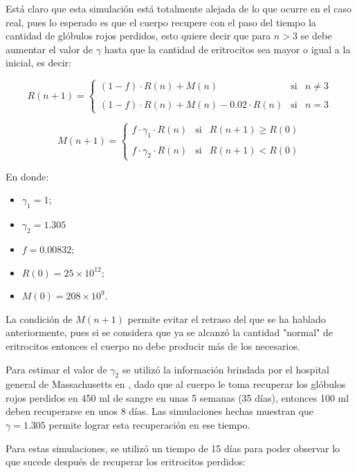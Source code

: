 Está claro que esta simulación está totalmente alejada de lo que ocurre en el caso real, pues lo esperado es que el cuerpo recupere con el paso del tiempo la cantidad de glóbulos rojos perdidos, esto quiere decir que para $n>3$ se debe aumentar el valor de $\gamma$ hasta que la cantidad de eritrocitos sea mayor o igual a la inicial, es decir:

$$R(n+1)= \left\{ \begin{array}{lcc} (1-f)\cdot R(n)+M(n) & \textrm{si} & n \neq 3 \\ \\ (1-f)\cdot R(n)+M(n)-0.02\cdot R(n) & \textrm{si} & n = 3\end{array} \right.$$

$$M(n+1)=\left\{ \begin{array}{lcc} f\cdot \gamma_1 \cdot R(n) & \textrm{si} & R(n+1) \geq R(0) \\ \\ f\cdot \gamma_2\cdot R(n) & \textrm{si} & R(n+1)<R(0)\end{array} \right.$$

En donde:
\begin{itemize}
    \item $\gamma_1=1$;
    \item $\gamma_2=1.305$
    \item $f=0.00832$;
    \item $R(0) = 25\times 10^{12};$
    \item $M(0) = 208 \times 10^{9}.$
\end{itemize}

La condición de $M(n+1)$ permite evitar el retraso del que se ha hablado anteriormente, pues si se considera que ya se alcanzó la cantidad "normal" de eritrocitos entonces el cuerpo no debe producir más de los necesarios.

Para estimar el valor de $\gamma_2$ se utilizó la información brindada por el hospital general de Massachusetts en \cite{Massachusetts}, dado que al cuerpo le toma recuperar los glóbulos rojos perdidos en 450 ml de sangre en unas 5 semanas (35 días), entonces 100 ml deben recuperarse en unos 8 días. Las simulaciones hechas muestran que $\gamma=1.305$ permite lograr esta recuperación en ese tiempo.

Para estas simulaciones, se utilizó un tiempo de 15 días para poder observar lo que sucede después de recuperar los eritrocitos perdidos:

